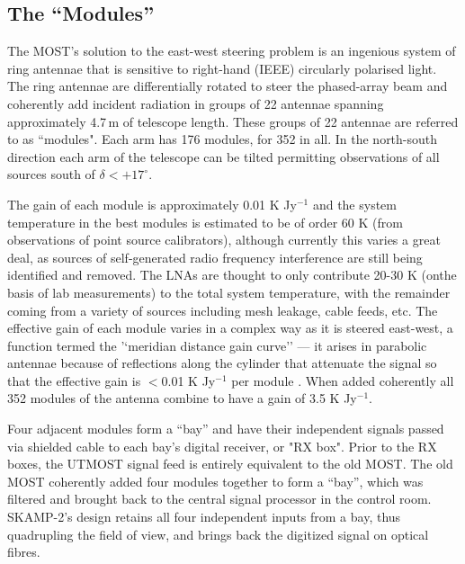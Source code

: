 \subsection{The ``Modules''}
The MOST's solution to the east-west steering problem is an ingenious system of ring antennae that is sensitive to right-hand (IEEE) circularly polarised light. The ring antennae are differentially rotated to steer the phased-array beam and coherently add incident radiation in groups of 22 antennae spanning approximately 4.7\,m of telescope length. These groups of 22 antennae are referred to as ``modules". Each arm has 176 modules, for 352 in all. In the north-south direction each arm of the telescope can be tilted permitting observations of all sources south of $\delta<+17^\circ$. 

The gain of each module is approximately 0.01 K Jy$^{-1}$ and the system temperature in the best modules is estimated to be of order 60 K (from observations of point source calibrators), although currently this varies a great deal, as sources of self-generated radio frequency interference are still being identified and removed. The LNAs are thought to only contribute 20-30 K (onthe basis of lab measurements) to the total system temperature, with the remainder coming from a variety of sources including mesh leakage, cable feeds, etc. The effective gain of each module varies in a complex way as it is steered east-west, a function termed the '`meridian distance gain curve'' --- it arises in parabolic antennae because of reflections along the cylinder that attenuate the signal so that the effective gain is $<$0.01 K Jy$^{-1}$ per module \cite{Hunstead_1996}. When added coherently all 352 modules of the antenna combine to have a gain of 3.5 K Jy$^{-1}$.

Four adjacent modules form a ``bay'' and have their independent signals passed via shielded cable to each bay's digital receiver, or "RX box". Prior to the RX boxes, the UTMOST signal feed is entirely equivalent to the old MOST. The old MOST coherently added four modules together to form a ``bay'', which was filtered and brought back to the central signal processor in the control room. SKAMP-2's design retains all four independent inputs from a bay, thus quadrupling the field of view, and brings back the digitized signal on optical fibres.
  
  